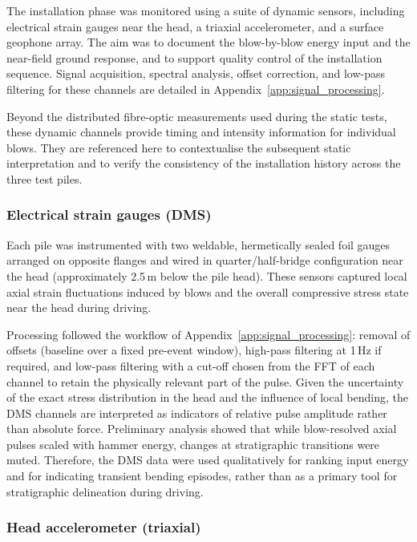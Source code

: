{{{{The installation phase was monitored using a suite of dynamic sensors, including electrical strain gauges near the head, a triaxial accelerometer, and a surface geophone array.
The aim was to document the blow-by-blow energy input and the near-field ground response, and to support quality control of the installation sequence. Signal acquisition, spectral analysis, offset correction, and low-pass filtering for these channels are detailed in Appendix~\ref{app:signal_processing}.

Beyond the distributed fibre-optic measurements used during the static tests, these dynamic channels provide timing and intensity information for individual blows. They are referenced here to contextualise the subsequent static interpretation and to verify the consistency of the installation history across the three test piles.

\subsubsection{Electrical strain gauges (DMS)}
\label{sec:DMS_dynamic}

Each pile was instrumented with two weldable, hermetically sealed foil gauges arranged on opposite flanges and wired in quarter/half-bridge configuration near the head (approximately 2.5\,m below the pile head). These sensors captured local axial strain fluctuations induced by blows and the overall compressive stress state near the head during driving.

Processing followed the workflow of Appendix~\ref{app:signal_processing}: removal of offsets (baseline over a fixed pre-event window), high-pass filtering at 1\,Hz if required, and low-pass filtering with a cut-off chosen from the FFT of each channel to retain the physically relevant part of the pulse. Given the uncertainty of the exact stress distribution in the head and the influence of local bending, the DMS channels are interpreted as indicators of relative pulse amplitude rather than absolute force. Preliminary analysis showed that while blow-resolved axial pulses scaled with hammer energy, changes at stratigraphic transitions were muted. Therefore, the DMS data were used qualitatively for ranking input energy and for indicating transient bending episodes, rather than as a primary tool for stratigraphic delineation during driving.

\subsubsection{Head accelerometer (triaxial)}
\label{sec:accel}

}}}}
